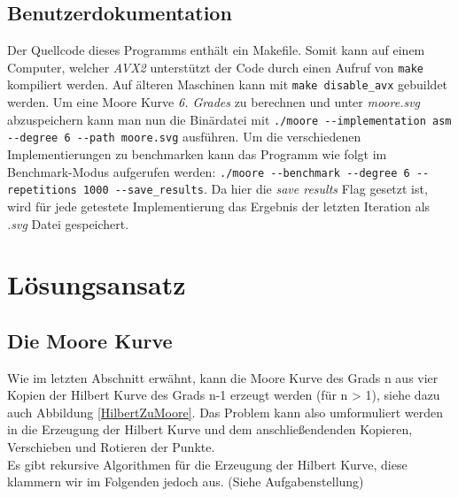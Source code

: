 \documentclass[course=erap]{aspdoc}
\begin{document}
\subsection{Benutzerdokumentation}
Der Quellcode dieses Programms enthält ein Makefile. Somit kann auf einem Computer, welcher \textit{AVX2} unterstützt der Code durch einen Aufruf von \texttt{make} kompiliert werden. Auf älteren Maschinen kann mit \texttt{make disable\_avx} gebuildet werden.
\newline
Um eine Moore Kurve \textit{6. Grades} zu berechnen und unter \textit{moore.svg} abzuspeichern kann man nun die Binärdatei mit \texttt{./moore -{}-implementation asm -{}-degree 6 -{}-path moore.svg} ausführen. 
Um die verschiedenen Implementierungen zu benchmarken kann das Programm wie folgt im Benchmark-Modus aufgerufen werden: \texttt{./moore -{}-benchmark -{}-degree 6 -{}-repetitions 1000 -{}-save\_results}. Da hier die \textit{save results} Flag gesetzt ist, wird für jede getestete Implementierung das Ergebnis der letzten Iteration als \textit{.svg} Datei gespeichert. 

\section{Lösungsansatz}

\subsection{Die Moore Kurve}

Wie im letzten Abschnitt erwähnt, kann die Moore Kurve des Grads n aus vier Kopien der Hilbert Kurve des Grads n-1 erzeugt werden (für n > 1), siehe dazu auch Abbildung \ref{HilbertZuMoore}.
Das Problem kann also umformuliert werden in die Erzeugung der Hilbert Kurve und dem anschließendenden Kopieren, Verschieben und Rotieren der Punkte. 
\\
Es gibt rekursive Algorithmen für die Erzeugung der Hilbert Kurve, diese klammern wir im Folgenden jedoch aus. (Siehe Aufgabenstellung)
\FloatBarrier
\end{document}
